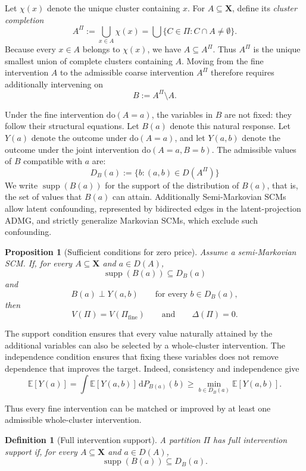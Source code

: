 \documentclass[twoside]{article}
\newtheorem{definition}{Definition}
\newtheorem{proposition}{Proposition}
\newcommand{\E}{\mathbb{E}}
\newcommand{\doo}{\mathrm{do}}
\begin{document}
Let $\chi(x)$ denote the unique cluster containing $x$. For $A\subseteq\mathbf X$, define its \emph{cluster completion}
\[
A^\Pi
:=
\bigcup_{x\in A}\chi(x)
=
  \bigcup\{C\in\Pi:C\cap A\neq\emptyset\}.
\]
Because every $x\in A$ belongs to $\chi(x)$, we have $A\subseteq A^\Pi$. Thus $A^\Pi$ is the unique smallest union of complete clusters containing $A$. Moving from the fine intervention $A$ to the admissible coarse intervention $A^\Pi$ therefore requires additionally intervening on
\[
  B:=A^\Pi\setminus A.
\]

Under the fine intervention $\doo(A=a)$, the variables in $B$ are not fixed: 
they follow their structural equations. Let $B(a)$ denote this natural response. Let $Y(a)$ denote the outcome under $\doo(A=a)$, and let $Y(a,b)$ denote the outcome under the joint intervention $\doo(A=a,B=b)$. The admissible values of $B$ compatible with $a$ are:
\[
  D_B(a):=\{b:(a,b)\in D(A^\Pi)\}
\]
We write $\operatorname{supp}(B(a))$ for the support of the distribution of $B(a)$, that is, the set of values that $B(a)$ can attain. Additionally Semi-Markovian SCMs allow latent confounding, represented by bidirected edges in the latent-projection ADMG, and strictly generalize Markovian SCMs, which exclude such confounding.

\begin{proposition}[Sufficient conditions for zero price]
\label{prop:free}
Assume a semi-Markovian SCM. If, for every $A\subseteq\mathbf X$ and
$a\in D(A)$,
\[
  \operatorname{supp}(B(a))\subseteq D_B(a)
\]
and
\[
  B(a)\perp Y(a,b)
  \qquad\text{for every }b\in D_B(a),
\]
then 
\[
V(\Pi)=V(\Pi_{\mathrm{fine}})
\qquad\text{and}\qquad
\Delta(\Pi)=0.
\]
\end{proposition}

The support condition ensures that every value naturally attained by the additional variables can also be selected by a whole-cluster intervention. The independence condition ensures that fixing these variables does not remove dependence that improves the target. Indeed, consistency and independence give
\[
  \E[Y(a)]
  =
  \int \E[Y(a,b)]\,\mathrm dP_{B(a)}(b)
  \ge
  \min_{b\in D_B(a)}\E[Y(a,b)].
\]

Thus every fine intervention can be matched or improved by at least one admissible whole-cluster intervention.

\begin{definition}[Full intervention support]
\label{def:full-support}
A partition $\Pi$ has full intervention support if, for every
$A\subseteq\mathbf X$ and $a\in D(A)$,
\[
\operatorname{supp}(B(a))\subseteq D_B(a).
\]
\end{definition}
\end{document}
